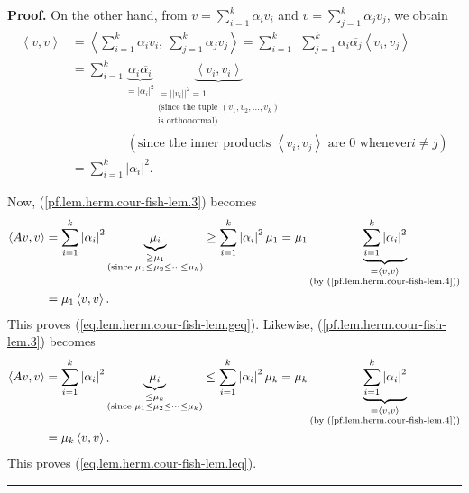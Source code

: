 \documentclass[numbers=enddot,12pt,final,onecolumn,notitlepage]{scrartcl}%
\numberwithin{exer}{subsection}
\theoremstyle{definition}
\newenvironment{proof}[1][Proof]{\noindent\textbf{#1.} }{\ \rule{0.5em}{0.5em}}
\let\sumnonlimits\sum
\renewcommand{\sum}{\sumnonlimits\limits}
\begin{document}
\begin{proof}
On the other hand, from $v=\sum_{i=1}^{k}\alpha_{i}v_{i}$ and $v=\sum
_{j=1}^{k}\alpha_{j}v_{j}$, we obtain%
\begin{align}
\left\langle v,v\right\rangle  &  =\left\langle \sum_{i=1}^{k}\alpha_{i}%
v_{i},\ \sum_{j=1}^{k}\alpha_{j}v_{j}\right\rangle =\sum_{i=1}^{k}%
\ \ \sum_{j=1}^{k}\alpha_{i}\overline{\alpha_{j}}\left\langle v_{i}%
,v_{j}\right\rangle \nonumber\\
&  =\sum_{i=1}^{k}\underbrace{\alpha_{i}\overline{\alpha_{i}}}_{=\left\vert
\alpha_{i}\right\vert ^{2}}\underbrace{\left\langle v_{i},v_{i}\right\rangle
}_{\substack{=\left\vert \left\vert v_{i}\right\vert \right\vert
^{2}=1\\\text{(since the tuple }\left(  v_{1},v_{2},\ldots,v_{k}\right)
\\\text{is orthonormal)}}}\nonumber\\
&  \ \ \ \ \ \ \ \ \ \ \ \ \ \ \ \ \ \ \ \ \left(  \text{since the inner
products }\left\langle v_{i},v_{j}\right\rangle \text{ are }0\text{ whenever
}i\neq j\right) \nonumber\\
&  =\sum_{i=1}^{k}\left\vert \alpha_{i}\right\vert ^{2}.
\label{pf.lem.herm.cour-fish-lem.4}%
\end{align}


Now, (\ref{pf.lem.herm.cour-fish-lem.3}) becomes%
\begin{align*}
\left\langle Av,v\right\rangle  &  =\sum_{i=1}^{k}\left\vert \alpha
_{i}\right\vert ^{2}\underbrace{\mu_{i}}_{\substack{\geq\mu_{1}\\\text{(since
}\mu_{1}\leq\mu_{2}\leq\cdots\leq\mu_{k}\text{)}}}\geq\sum_{i=1}^{k}\left\vert
\alpha_{i}\right\vert ^{2}\mu_{1}=\mu_{1}\underbrace{\sum_{i=1}^{k}\left\vert
\alpha_{i}\right\vert ^{2}}_{\substack{=\left\langle v,v\right\rangle
\\\text{(by (\ref{pf.lem.herm.cour-fish-lem.4}))}}}\\
&  =\mu_{1}\left\langle v,v\right\rangle .
\end{align*}
This proves (\ref{eq.lem.herm.cour-fish-lem.geq}). Likewise,
(\ref{pf.lem.herm.cour-fish-lem.3}) becomes%
\begin{align*}
\left\langle Av,v\right\rangle  &  =\sum_{i=1}^{k}\left\vert \alpha
_{i}\right\vert ^{2}\underbrace{\mu_{i}}_{\substack{\leq\mu_{k}\\\text{(since
}\mu_{1}\leq\mu_{2}\leq\cdots\leq\mu_{k}\text{)}}}\leq\sum_{i=1}^{k}\left\vert
\alpha_{i}\right\vert ^{2}\mu_{k}=\mu_{k}\underbrace{\sum_{i=1}^{k}\left\vert
\alpha_{i}\right\vert ^{2}}_{\substack{=\left\langle v,v\right\rangle
\\\text{(by (\ref{pf.lem.herm.cour-fish-lem.4}))}}}\\
&  =\mu_{k}\left\langle v,v\right\rangle .
\end{align*}
This proves (\ref{eq.lem.herm.cour-fish-lem.leq}).
\end{proof}
\end{document}
